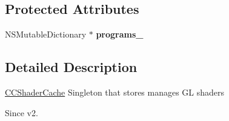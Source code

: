 \subsection*{Protected Attributes}
\begin{DoxyCompactItemize}
\item 
\hypertarget{interface_c_c_shader_cache_a2a9255db64d72d938c68e2352bf0c529}{N\-S\-Mutable\-Dictionary $\ast$ {\bfseries programs\-\_\-}}\label{interface_c_c_shader_cache_a2a9255db64d72d938c68e2352bf0c529}

\end{DoxyCompactItemize}


\subsection{Detailed Description}
\hyperlink{interface_c_c_shader_cache}{C\-C\-Shader\-Cache} Singleton that stores manages G\-L shaders \begin{DoxySince}{Since}
v2. 
\end{DoxySince}


